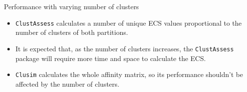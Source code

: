 \begin{frame}{Performance with varying number of clusters}
    \begin{itemize}
    \item \texttt{ClustAssess} calculates a number of unique ECS values proportional to the number of clusters of both partitions.
        

    \item It is expected that, as the number of clusters increases, the \texttt{ClustAssess} package will require more time and space to calculate the ECS.

    \item \texttt{Clusim} calculates the whole affinity matrix, so its performance shouldn't be affected by the number of clusters.

    \end{itemize}
\end{frame}

